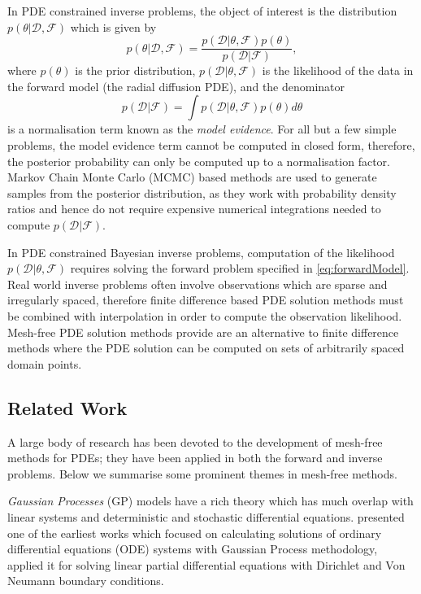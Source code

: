 In PDE constrained inverse problems, the object of interest is the distribution  
$p(\theta \rvert \mathcal{D}, \mathcal{F})$ which is given by 
\[
  p(\theta \rvert \mathcal{D}, \mathcal{F}) = \frac{
    p(\mathcal{D} \rvert \theta, \mathcal{F}) p(\theta)
  }{
    p(\mathcal{D}\rvert\mathcal{F})
  }, 
\]
where $p(\theta)$ is the prior distribution, $p(\mathcal{D} \rvert \theta, \mathcal{F})$ is the 
likelihood of the data in the forward model (the radial diffusion PDE), and the denominator 
\[
  p(\mathcal{D}\rvert\mathcal{F}) = \int{
    p(\mathcal{D} \rvert \theta, \mathcal{F}) p(\theta) d\theta
  }  
\] 
is a normalisation term known as the \emph{model evidence}. For all but a few simple problems, the 
model evidence term cannot be computed in closed form, therefore, the posterior probability can 
only be computed up to a normalisation factor. Markov Chain Monte Carlo (MCMC) based methods are 
used to generate samples from the posterior distribution, as they work with probability density 
ratios and hence do not require expensive numerical integrations needed to compute 
$p(\mathcal{D}\rvert\mathcal{F})$. 

In PDE constrained Bayesian inverse problems, computation of the likelihood 
$p(\mathcal{D} \rvert \theta, \mathcal{F})$ requires solving the forward problem specified in 
\cref{eq:forwardModel}. Real world inverse problems often involve observations which are sparse and 
irregularly spaced, therefore finite difference based PDE solution methods must be combined with 
interpolation in order to compute the observation likelihood. Mesh-free PDE solution methods 
provide are an alternative to finite difference methods where the PDE solution can be computed 
on sets of arbitrarily spaced domain points.

\subsection{Related Work}

A large body of research has been devoted to the development of mesh-free methods for PDEs; they 
have been applied in both the forward and inverse problems. Below we summarise some prominent 
themes in mesh-free methods.

\emph{Gaussian Processes} (GP) models \citep{Rasmussen:2005:GPM:1162254} have a rich theory 
which has much overlap with linear systems and deterministic and stochastic differential equations. 
\citet{Skilling1992} presented one of the earliest works which focused on calculating solutions of 
ordinary differential equations (ODE) systems with Gaussian Process methodology, \citet{Graepel} 
applied it for solving linear partial differential equations with Dirichlet and Von Neumann 
boundary conditions.


